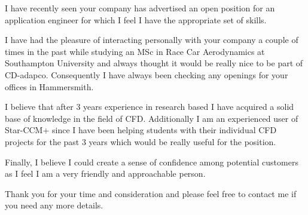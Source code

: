 \documentclass[10pt,stdletter,dateno,sigleft]{newlfm} %
\begin{document}
\begin{newlfm}


I have recently seen your company has advertised an open position for an application
engineer for which I feel I have the appropriate set of skills.

I have had the pleasure of interacting personally with your company a couple of times in
the past while studying an MSc in Race Car Aerodynamics at Southampton University and always
thought it would be really nice to be part of CD-adapco. Consequently I have always been
checking any openings for your offices in Hammersmith.

I believe that after 3 years experience in research based I have acquired a solid base of
knowledge in the field of CFD. Additionally I am an experienced user of Star-CCM+ since I
have been helping students with their individual CFD projects for the past 3 years which
would be really useful for the position.

Finally, I believe I could create a sense of confidence among potential customers
as I feel I am a very friendly and approachable person.

Thank you for your time and consideration and please feel free to contact me if you need
any more details.

\end{newlfm}
\end{document}
